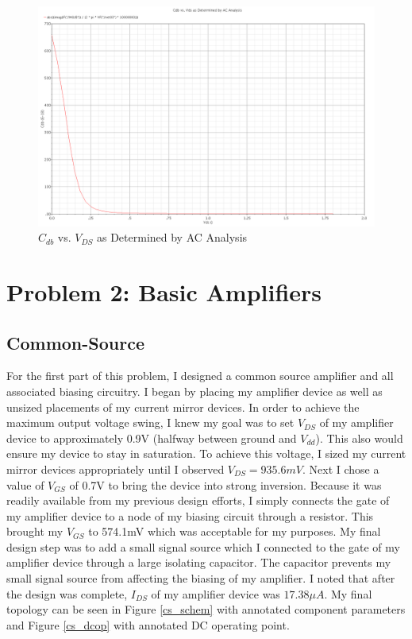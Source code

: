 \documentclass{article}
\begin{document}
\begin{figure}[H]
\centering
\includegraphics[width=5in]{1f.png}
\caption{$C_{db}$ vs. $V_{DS}$ as Determined by AC Analysis}
\label{1f}
\end{figure}
\newpage

\section{Problem 2: Basic Amplifiers}
\subsection{Common-Source}
For the first part of this problem, I designed a common source amplifier and all associated biasing circuitry. I began by placing my amplifier device as well as unsized placements of my current mirror devices. In order to achieve the maximum output voltage swing, I knew my goal was to set $V_{DS}$ of my amplifier device to approximately 0.9V (halfway between ground and $V_{dd}$). This also would ensure my device to stay in saturation. To achieve this voltage, I sized my current mirror devices appropriately until I observed $V_{DS} = 935.6mV$. Next I chose a value of $V_{GS}$ of 0.7V to bring the device into strong inversion. Because it was readily available from my previous design efforts, I simply connects the gate of my amplifier device to a node of my biasing circuit through a resistor. This brought my $V_{GS}$ to 574.1mV which was acceptable for my purposes. My final design step was to add a small signal source which I connected to the gate of my amplifier device through a large isolating capacitor. The capacitor prevents my small signal source from affecting the biasing of my amplifier. I noted that after the design was complete, $I_{DS}$ of my amplifier device was $17.38\mu A$. My final topology can be seen in Figure \ref{cs_schem} with annotated component parameters and Figure \ref{cs_dcop} with annotated DC operating point.
\end{document}
